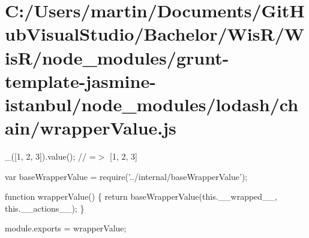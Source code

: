 \hypertarget{_c_1_2_users_2martin_2_documents_2_git_hub_visual_studio_2_bachelor_2_wis_r_2_wis_r_2node_module20958bd8710ad44c9763490860926603}{}\section{C\+:/\+Users/martin/\+Documents/\+Git\+Hub\+Visual\+Studio/\+Bachelor/\+Wis\+R/\+Wis\+R/node\+\_\+modules/grunt-\/template-\/jasmine-\/istanbul/node\+\_\+modules/lodash/chain/wrapper\+Value.\+js}
\+\_\+(\mbox{[}1, 2, 3\mbox{]}).value(); // =$>$ \mbox{[}1, 2, 3\mbox{]}


\begin{DoxyCodeInclude}
var baseWrapperValue = require(\textcolor{stringliteral}{'../internal/baseWrapperValue'});

\textcolor{keyword}{function} wrapperValue() \{
  \textcolor{keywordflow}{return} baseWrapperValue(this.\_\_wrapped\_\_, this.\_\_actions\_\_);
\}

module.exports = wrapperValue;
\end{DoxyCodeInclude}
 